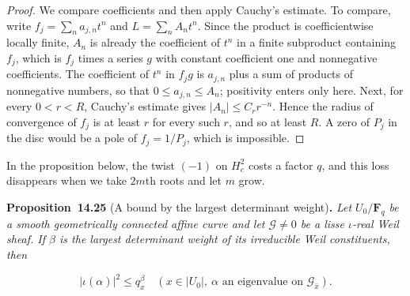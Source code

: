 \documentclass[11pt]{article}
\newenvironment{bpstatement}[2]{\par\addvspace{0.6\baselineskip}\noindent\textbf{#1}#2\textbf{.}\enspace\ignorespaces}
  {\par\addvspace{0.4\baselineskip}}
\newenvironment{bpstatementit}[2]{\begin{bpstatement}{#1}{#2}\itshape\ignorespaces}{\end{bpstatement}}
\begin{document}
\begin{proof}[{Proof}]\label{bp76}%
We compare coefficients and then apply Cauchy's estimate. To compare, write \(f_j=\sum_na_{j,n}t^n\) and \(L=\sum_nA_nt^n\). Since the product is coefficientwise locally finite, \(A_n\) is already the coefficient of \(t^n\) in a finite subproduct containing \(f_j\), which is \(f_j\) times a series \(g\) with constant coefficient one and nonnegative coefficients. The coefficient of \(t^n\) in \(f_jg\) is \(a_{j,n}\) plus a sum of products of nonnegative numbers, so that \(0\le a_{j,n}\le A_n\); positivity enters only here.  Next, for every \(0<r<R\), Cauchy's estimate gives \(|A_n|\le C_rr^{-n}\). Hence the radius of convergence of \(f_j\) is at least \(r\) for every such \(r\), and so at least \(R\).  A zero of \(P_j\) in the disc would be a pole of \(f_j=1/P_j\), which is impossible.
\end{proof}

\label{bp77}%
In the proposition below, the twist \((-1)\) on \(H^2_c\) costs a factor \(q\), and this loss disappears when we take \(2m\)th roots and let \(m\) grow.

\label{bp78}%
\begin{bpstatementit}{Proposition~14.25}{ (A bound by the largest determinant weight)}
Let \(U_0/\mathbf F_q\) be a smooth geometrically connected affine curve and let \(\mathcal G\ne0\) be a lisse \(\iota\)-real Weil sheaf.  If \(\beta\) is the largest determinant weight of its irreducible Weil constituents, then

\[
|\iota(\alpha)|^2\le q_x^\beta
\quad(x\in|U_0|,\ \alpha\text{ an eigenvalue on }\mathcal G_{\bar x}).
\]
\end{bpstatementit}
\end{document}
